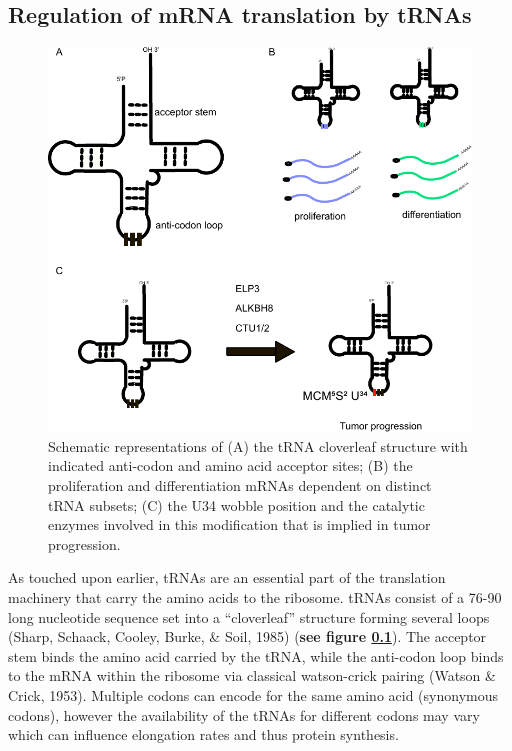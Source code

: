 \documentclass[12pt,openany]{book}
\begin{document}
\subsection{Regulation of mRNA translation by tRNAs} \label{tRNA}

\begin{figure}
  \includegraphics{./figures/tRNA.pdf}
  \caption{ Schematic representations of (A) the tRNA cloverleaf structure with indicated anti-codon and amino acid acceptor sites;  (B)  the proliferation and differentiation mRNAs dependent on distinct tRNA subsets; (C) the U34 wobble position and the catalytic enzymes involved in this modification that is implied in tumor progression.
 \label{fig:tRNA}}
\end{figure}

As touched upon earlier, tRNAs are an essential part of the translation
machinery that carry the amino acids to the ribosome. tRNAs consist of a
76-90 long nucleotide sequence set into a ``cloverleaf'' structure
forming several loops (Sharp, Schaack, Cooley, Burke, \& Soil, 1985)
(\textbf{see figure \ref{tRNA}}). The acceptor stem binds the amino acid
carried by the tRNA, while the anti-codon loop binds to the mRNA within
the ribosome via classical watson-crick pairing (Watson \& Crick, 1953).
Multiple codons can encode for the same amino acid (synonymous codons),
however the availability of the tRNAs for different codons may vary
which can influence elongation rates and thus protein synthesis.
\end{document}
